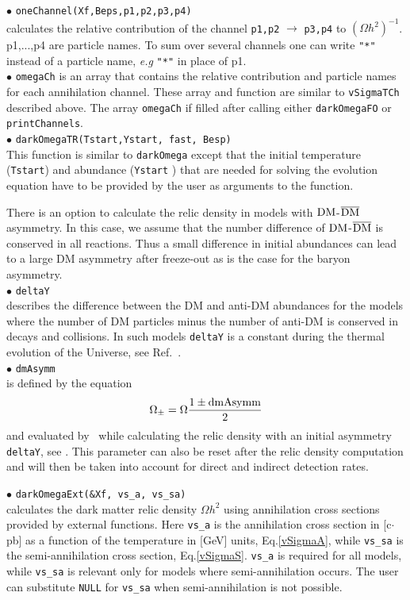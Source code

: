 \documentclass[12pt,a4paper]{article}
\begin{document}
\noindent
$\bullet$ \verb|oneChannel(Xf,Beps,p1,p2,p3,p4)|\\   
calculates the relative   contribution of the  channel \verb|p1,p2| $\to$ \verb|p3,p4|
to $(\Omega h^2)^{-1}$. p1,...,p4 are particle names.  To 
sum over several channels one can write  \verb|"*"| instead 
of  a particle name, {\it e.g} \verb|"*"| in place of p1.\\

\noindent
$\bullet$ \verb|omegaCh| is an array that contains the relative contribution and particle names for each
annihilation channel. These array and function
are similar to {\tt vSigmaTCh} described above. The array {\tt omegaCh} if filled after calling either
{\tt darkOmegaFO} or {\tt printChannels}. \\

\noindent
$\bullet$ \verb|darkOmegaTR(Tstart,Ystart, fast, Besp)|\\
This function is similar to  \verb|darkOmega| except that the  initial  temperature (\verb|Tstart|) and abundance (\verb|Ystart| ) that are needed for solving the  evolution equation have to be provided by   the user as arguments to the function.


There is an option to calculate the relic density in  models with  ${\rm DM}$-$\overline{\rm DM}$ asymmetry.  
In this case, we assume that the  number difference of ${\rm DM}$-$\overline{\rm DM}$ is conserved in all reactions.
Thus a small difference in initial abundances can lead to a  large DM asymmetry after freeze-out as is the case for the  baryon asymmetry.\\

\noindent
$\bullet$ \verb|deltaY|\\
describes the difference between the DM and anti-DM abundances for the
models where the number of DM particles minus the number of anti-DM is conserved in
decays and collisions. In such models \verb|deltaY| is a
constant during the thermal evolution of the Universe,   see Ref.~\cite{Belanger:2013oya}.\\
\noindent
$\bullet$ \verb|dmAsymm|\\
is defined by the equation 
$$ \Omega_{\pm} = \Omega \frac{1 \pm {\rm dmAsymm}}{2}$$
and evaluated  by \micro\ while calculating the relic density  with an
initial asymmetry \verb|deltaY|, see \cite{Belanger:2013oya}. 
This parameter can also be reset  after the relic density 
computation and will then be taken into account for direct and 
indirect detection rates.

\noindent
$\bullet$ \verb|darkOmegaExt(&Xf, vs_a, vs_sa)|\\
calculates the dark matter relic density $\Omega h^2$  
using annihilation cross sections  provided by external 
functions. Here  \verb|vs_a| is the  annihilation cross section in [c$\cdot$pb] as 
a function of the temperature in [GeV]  units, Eq.\ref{vSigmaA},  while  \verb|vs_sa| 
is the semi-annihilation cross section, Eq.\ref{vSigmaS}.  \verb|vs_a| is required for all models, 
while \verb|vs_sa| is relevant only for models where semi-annihilation occurs.  The user 
can  substitute {\tt NULL} for \verb|vs_sa| when semi-annihilation is not possible.
 
\end{document}
